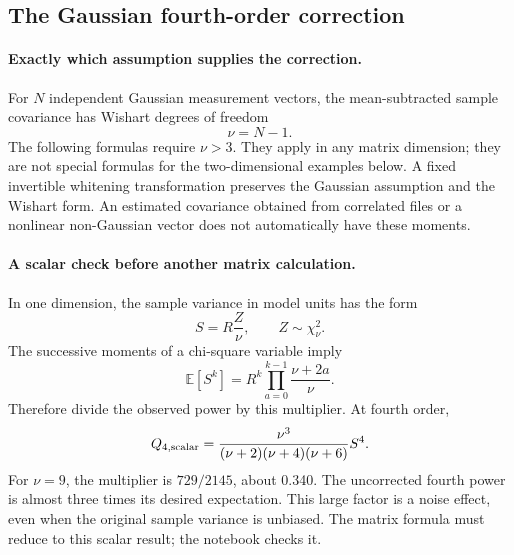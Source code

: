 \documentclass[11pt]{article}
\newcommand{\E}{\mathbb{E}}
\begin{document}
\subsection{The Gaussian fourth-order correction}
\label{sec:fourth-wishart}
\paragraph{Exactly which assumption supplies the correction.}
For $N$ independent Gaussian measurement vectors, the mean-subtracted
sample covariance has Wishart degrees of freedom
\begin{equation}
 \nu=N-1.
\end{equation}
The following formulas require $\nu>3$. They apply in any matrix dimension;
they are not special formulas for the two-dimensional examples below.
A fixed invertible whitening transformation preserves the Gaussian
assumption and the Wishart form. An estimated covariance obtained from
correlated files or a nonlinear non-Gaussian vector does not automatically
have these moments.

\paragraph{A scalar check before another matrix calculation.}
In one dimension, the sample variance in model units has the form
\begin{equation}
 S=R\frac{Z}{\nu},\qquad Z\sim\chi^2_\nu.
\end{equation}
The successive moments of a chi-square variable imply
\begin{equation}
 \E[S^k]
 =R^k\prod_{a=0}^{k-1}\frac{\nu+2a}{\nu}.
\end{equation}
Therefore divide the observed power by this multiplier. At fourth order,
\begin{equation}
 Q_{4,\rm scalar}
 =\frac{\nu^3}{(\nu+2)(\nu+4)(\nu+6)}S^4.
\end{equation}
For $\nu=9$, the multiplier is $729/2145$, about 0.340. The uncorrected
fourth power is almost three times its desired expectation. This large
factor is a noise effect, even when the original sample variance is unbiased.
The matrix formula must reduce to this scalar result; the notebook checks it.
\end{document}

